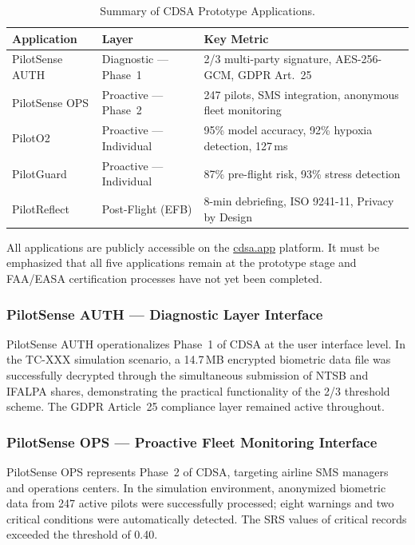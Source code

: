 \documentclass[12pt,a4paper]{article}
\begin{document}
\begin{table}[H]
  \centering
  \caption{Summary of CDSA Prototype Applications.}
  \label{tab:apps}
  \begin{tabularx}{\textwidth}{llX}
    \toprule
    \textbf{Application} & \textbf{Layer} & \textbf{Key Metric} \\
    \midrule
    PilotSense AUTH & Diagnostic --- Phase~1 & 2/3 multi-party signature, AES-256-GCM, GDPR Art.~25 \\
    PilotSense OPS  & Proactive --- Phase~2 & 247 pilots, SMS integration, anonymous fleet monitoring \\
    PilotO2         & Proactive --- Individual & 95\% model accuracy, 92\% hypoxia detection, 127\,ms \\
    PilotGuard      & Proactive --- Individual & 87\% pre-flight risk, 93\% stress detection \\
    PilotReflect    & Post-Flight (EFB)       & 8-min debriefing, ISO 9241-11, Privacy by Design \\
    \bottomrule
  \end{tabularx}
\end{table}
\fussy

All applications are publicly accessible on the \href{https://cdsa.app}{cdsa.app} platform.
It must be emphasized that all five applications remain at the prototype stage and FAA/EASA
certification processes have not yet been completed.

\subsubsection{PilotSense AUTH --- Diagnostic Layer Interface}
PilotSense AUTH operationalizes Phase~1 of CDSA at the user interface level. In the TC-XXX
simulation scenario, a 14.7\,MB encrypted biometric data file was successfully decrypted through
the simultaneous submission of NTSB and IFALPA shares, demonstrating the practical functionality
of the 2/3 threshold scheme. The GDPR Article~25 compliance layer remained active throughout.

\subsubsection{PilotSense OPS --- Proactive Fleet Monitoring Interface}
PilotSense OPS represents Phase~2 of CDSA, targeting airline SMS managers and operations centers.
In the simulation environment, anonymized biometric data from 247 active pilots were successfully
processed; eight warnings and two critical conditions were automatically detected. The SRS values
of critical records exceeded the threshold of 0.40.
\end{document}
